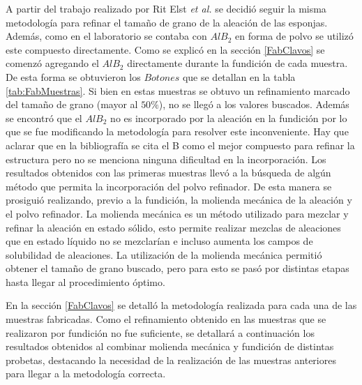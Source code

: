 \documentclass[a4paper,12pt,fleqn,twoside,openany]{book}
\begin{document}
A partir del trabajo realizado por Rit Elst \textit{et al.} \cite{ritelst} se decidió seguir la misma metodología para refinar el tamaño de grano de la aleación de las esponjas. Además, como en el laboratorio se contaba con $AlB_2$ en forma de polvo se utilizó este compuesto directamente. Como se explicó en la sección \ref{FabClavos} se comenzó agregando el $AlB_2$ directamente durante la fundición de cada muestra. De esta forma se obtuvieron los $Botones$ que se detallan en la tabla \ref{tab:FabMuestras}. Si bien en estas muestras se obtuvo un refinamiento marcado del tamaño de grano (mayor al $50\%$), no se llegó a los valores buscados. Además se encontró que el $AlB_2$ no es incorporado por la aleación en la fundición por lo que se fue modificando la metodología para resolver este inconveniente. Hay que aclarar que en la bibliografía se cita el B como el mejor compuesto para refinar la estructura pero no se menciona ninguna dificultad en la incorporación.  
Los resultados obtenidos con las primeras muestras llevó a la búsqueda de algún método que permita la incorporación del polvo refinador. De esta manera se prosiguió realizando, previo a la fundición, la molienda mecánica de la aleación y el polvo refinador. La molienda mecánica es un método utilizado para mezclar y refinar la aleación en estado sólido, esto permite realizar mezclas de aleaciones que en estado líquido no se mezclarían e incluso aumenta los campos de solubilidad de aleaciones. La utilización de la molienda mecánica permitió obtener el tamaño de grano buscado, pero para esto se pasó por distintas etapas hasta llegar al procedimiento óptimo.

En la sección \ref{FabClavos} se detalló la metodología realizada para cada una de las muestras fabricadas. Como el refinamiento obtenido en las muestras que se realizaron por fundición no fue suficiente, se detallará a continuación los resultados obtenidos al combinar molienda mecánica y fundición de distintas probetas, destacando la necesidad de la realización de las muestras anteriores para llegar a la metodología correcta.
\end{document}
